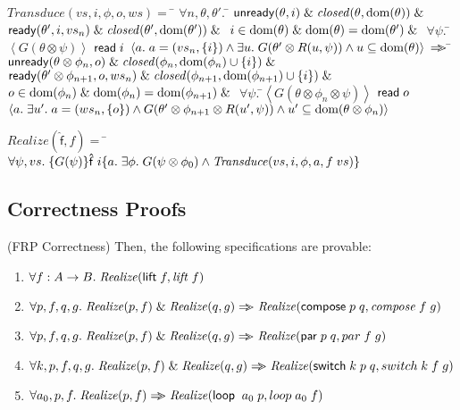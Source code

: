 \begin{specification}
\nextline $\mathit{Transduce}(vs, i, \phi, o, ws)  =  $
\nextline\;\;\= $\forall n, \theta, \theta'.$ 
\nextline\qquad\= $\mathsf{unready}({\theta}, {i}) \;\&\; \mathit{closed}(\theta, \mbox{dom}({\theta})) \;\&\; $ 
\nextline\> $\mathsf{ready}({\theta'}, {i}, {vs_n}) \;\&\; \mathit{closed}(\theta', \mbox{dom}({\theta'})) \;\&\;$
\nextline\> $i \in \mbox{dom}({\theta}) \;\&\; \mbox{dom}({\theta}) = \mbox{dom}({\theta'}) \;\&\;$ 
\nextline\> $\forall \psi.\;$\=$\left<G(\theta \otimes \psi)\right>$ 
\nextline\>\> $\mathsf{read}\; i$
\nextline\>\> $\left<a.\;a = (vs_n, \{{i}\}) \land \exists u.\; G(\theta' \otimes R(u,\psi)) \land u \subseteq \mbox{dom}({\theta}) \right>$ 
\nextline\> $\Rightarrow\!\!\!>$ 
\nextline\qquad\= $\mathsf{unready}({\theta \otimes \phi_n}, {o}) \;\&\; \mathit{closed}(\phi_n, \mbox{dom}({\phi_n}) \cup \{{i}\}) \;\&\; $ 
\nextline\> $\mathsf{ready}({\theta' \otimes \phi_{n+1}}, {o}, {ws_n}) \;\&\; \mathit{closed}(\phi_{n+1}, \mbox{dom}({\phi_{n+1}}) \cup \{{i}\}) \;\&\;$
\nextline\> $o \in \mbox{dom}({\phi_n}) \;\&\; \mbox{dom}({\phi_n}) = \mbox{dom}({\phi_{n+1}}) \;\&\;$ 
\nextline\> $\forall \psi.\;$\=$\left<G(\theta \otimes \phi_n \otimes \psi)\right>$ 
\nextline\>\>$\mathsf{read}\; o$ 
\nextline\>\>$\left<a.\;\exists u'.\;a = (ws_n, \{{o}\}) \land 
                        G(\theta' \otimes \phi_{n+1} \otimes R(u', \psi)) \land u' \subseteq \mbox{dom}({\theta \otimes \phi_n})\right>$ 
\end{specification}

\begin{specification}
\nextline $\mathit{Realize}(\mathsf{\hat{f}}, f) = $ 
\nextline\;\;\= $\forall \psi, vs.\; \{{G(\psi)}\}{\mathsf{\hat{f}}\;i}\{{a}.\;{\exists \phi.\;G(\psi \otimes \phi_0) \land \mathit{Transduce}(vs, i, \phi, a, f\;vs)}\}$
\end{specification}

\subsection{Correctness Proofs}

\begin{prop}{(FRP Correctness)}
Then, the following specifications are provable: 
\begin{enumerate}
\item $\forall f:A\to B.\; \mathit{Realize}(\mathsf{lift}\; f, \mathit{lift}\;f)$
\item $\forall p, f, q, g.\;\mathit{Realize}(p, f) \;\&\; \mathit{Realize}(q, g) \Rightarrow\!\!\!> \mathit{Realize}(\mathsf{compose}\; p\;q, \mathit{compose}\;f\;g)$
\item $\forall p, f, q, g.\;\mathit{Realize}(p, f) \;\&\; \mathit{Realize}(q, g)
                       \Rightarrow\!\!\!> \mathit{Realize}(\mathsf{par}\; p\;q, par\;f\;g)$
\item $\forall k, p, f, q, g.\;\mathit{Realize}(p, f) \;\&\; \mathit{Realize}(q, g)
                          \Rightarrow\!\!\!> \mathit{Realize}(\mathsf{switch}\; k\;p\;q, switch\;k\;f\;g)$
\item $\forall a_0, p, f.\; \mathit{Realize}(p, f) \Rightarrow\!\!\!> \mathit{Realize}(\mathsf{loop}\;\;a_0\;p, loop\;a_0\;f)$
\end{enumerate}

\end{prop}

